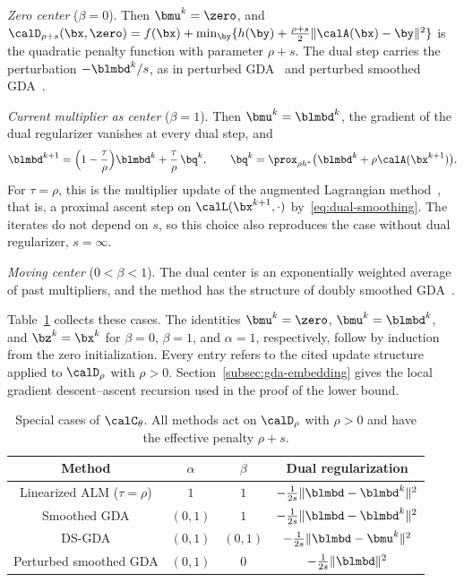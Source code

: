\emph{Zero center} (\(\beta=0\)). Then \(\bmu^k=\zero\), and
\(\calD_{\rho+s}(\bx,\zero)=f(\bx)+\min_{\by}\{h(\by)
+\frac{\rho+s}{2}\|\calA(\bx)-\by\|^2\}\) is the quadratic penalty function
with parameter \(\rho+s\). The dual step carries the perturbation
\(-\blmbd^k/s\), as in perturbed GDA~\cite{lu2020hybrid,xu2023unified} and
perturbed smoothed GDA~\cite{li2026smoothing}.

\emph{Current multiplier as center} (\(\beta=1\)). Then
\(\bmu^k=\blmbd^k\), the gradient of the dual regularizer vanishes at every
dual step, and
\[
    \blmbd^{k+1}=\Bigl(1-\frac{\tau}{\rho}\Bigr)\blmbd^k+\frac{\tau}{\rho}\,\bq^k,
    \qquad
    \bq^k=\prox_{\rho h^*}\bigl(\blmbd^k+\rho\calA(\bx^{k+1})\bigr).
\]
For \(\tau=\rho\), this is the multiplier update of the augmented Lagrangian
method~\cite{hestenes1969multiplier,powell1969method,rockafellar1973multiplier},
that is, a proximal ascent step on \(\calL(\bx^{k+1},\cdot)\)
by~\eqref{eq:dual-smoothing}. The iterates do not depend on \(s\), so this
choice also reproduces the case without dual regularizer, \(s=\infty\).

\emph{Moving center} (\(0<\beta<1\)). The dual center is an exponentially
weighted average of past multipliers, and the method has the structure of doubly smoothed
GDA~\cite{zheng2023universal}.

Table~\ref{tab:special-cases} collects these cases. The identities
\(\bmu^k=\zero\), \(\bmu^k=\blmbd^k\), and \(\bz^k=\bx^k\) for
\(\beta=0\), \(\beta=1\), and \(\alpha=1\), respectively, follow by induction
from the zero initialization. Every entry refers to the cited update structure
applied to \(\calD_\rho\) with \(\rho>0\).
Section~\ref{subsec:gda-embedding} gives the local gradient descent--ascent
recursion used in the proof of the lower bound.

\begin{table}[t]
\centering
\small
\caption{Special cases of \(\calC_\theta\). All methods act on
\(\calD_\rho\) with \(\rho>0\) and have the effective penalty \(\rho+s\).}
\label{tab:special-cases}
\renewcommand{\arraystretch}{1.1}
\setlength{\tabcolsep}{5pt}
\begin{tabular}{@{}cccc@{}}
\toprule
Method & \(\alpha\) & \(\beta\) & Dual regularization \\
\midrule
\makecell{Linearized ALM (\(\tau=\rho\))\\ \cite{luSingleLoopGradientDescent2022}}
  & \(1\) & \(1\) & \(-\frac{1}{2s}\|\blmbd-\blmbd^k\|^2\) \\
\makecell{Smoothed GDA\\ \cite{zhang2020smoothed}}
  & \((0,1)\) & \(1\) & \(-\frac{1}{2s}\|\blmbd-\blmbd^k\|^2\) \\
\makecell{DS-GDA\\ \cite{zheng2023universal}}
  & \((0,1)\) & \((0,1)\) & \(-\frac{1}{2s}\|\blmbd-\bmu^k\|^2\) \\
\makecell{Perturbed smoothed GDA\\ \cite{li2026smoothing}}
  & \((0,1)\) & \(0\) & \(-\frac{1}{2s}\|\blmbd\|^2\) \\
\bottomrule
\end{tabular}
\end{table}

